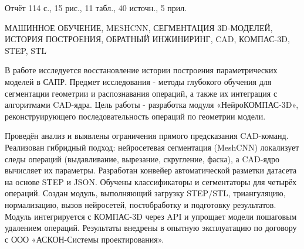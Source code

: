 

Отчёт 114 с., 15 рис., 11 табл., 40 источн., 5 прил.

МАШИННОЕ ОБУЧЕНИЕ, MESHCNN, СЕГМЕНТАЦИЯ 3D-МОДЕЛЕЙ, ИСТОРИЯ ПОСТРОЕНИЯ, ОБРАТНЫЙ ИНЖИНИРИНГ, CAD, КОМПАС-3D, STEP, STL

В работе исследуется восстановление истории построения параметрических моделей в САПР. Предмет исследования - методы глубокого обучения для сегментации геометрии и распознавания операций, а также их интеграция с алгоритмами CAD-ядра. Цель работы - разработка модуля «НейроКОМПАС-3D», реконструирующего последовательность операций по геометрии модели.

Проведён анализ и выявлены ограничения прямого предсказания CAD-команд. Реализован гибридный подход: нейросетевая сегментация (MeshCNN) локализует следы операций (выдавливание, вырезание, скругление, фаска), а CAD-ядро вычисляет их параметры. Разработан конвейер автоматической разметки датасета на основе STEP и JSON. Обучены классификаторы и сегментаторы для четырёх операций. Создан модуль, выполняющий загрузку STEP/STL, триангуляцию, нормализацию, вызов нейросетей, постобработку и подготовку результатов. Модуль интегрируется с КОМПАС-3D через API и упрощает модели пошаговым удалением операций. Результаты внедрены в опытную эксплуатацию по договору с ООО «АСКОН-Системы проектирования».

